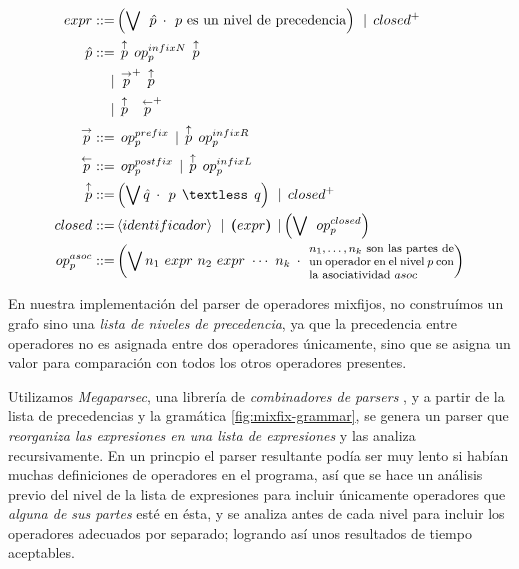 {\begin{investigationfr}
{   %
\newcommand{\overp}[1]{\overset{#1}{p}}
\renewcommand{\_}{\:\:}

\begin{equation*}
\begin{split}
expr ::=& \left( \bigvee \_ \hat{p} \_ \cdotp \_
                 \text{$p$ es un nivel de precedencia} \right) \_
        | \_ closed^{+}
\\
\hat{p} ::=& \_ \overp{\uparrow} \_ op_p^{infixN} \_ \overp{\uparrow} \\
          |& \_ \overp{\rightarrow}^{+} \_ \overp{\uparrow} \\
          |& \_ \overp{\uparrow}\quad \overp{\leftarrow}^{+}
\\
\overp{\rightarrow} ::=& \_ op_p^{prefix} \_
                       | \_ \overp{\uparrow} \_ op_p^{infixR}
\\
\overp{\leftarrow} ::=& \_ op_p^{postfix} \_
                      | \_ \overp{\uparrow} \_ op_p^{infixL}
\\
\overp{\uparrow} ::=& \left( \bigvee \hat{q} \_ \cdotp \_
                             p \_ \textless \_ q \right) \_
                    | \_ closed^{+}
\\
closed ::=& \left<identificador\right> \_
          | \_ \boldsymbol{(} expr \boldsymbol{)} \_
          | \left( \bigvee \_ op_p^{closed} \right)
\\
op_p^{asoc} ::=& \left( \bigvee n_1\ expr\ n_2\ expr\ \cdots\ n_k \_ \cdotp \_
                        \parbox{0.3\textwidth}{\footnotesize$n_1,\ldots,n_k$ son las partes de un operador en el nivel $p$ con la asociatividad $asoc$} \right)
\end{split}
\end{equation*}
\label{fig:mixfix-grammar}
}
\end{investigationfr}

\begin{implementationfr}
En nuestra implementación del parser de operadores mixfijos, no construímos un grafo sino una \emph{lista de niveles de precedencia}, ya que la precedencia entre operadores no es asignada entre dos operadores únicamente, sino que se asigna un valor para comparación con todos los otros operadores presentes.

Utilizamos \emph{Megaparsec}, una librería de \emph{combinadores de parsers} \cite{megaparsec}, y a partir de la lista de precedencias y la gramática \ref{fig:mixfix-grammar}, se genera un parser que \emph{reorganiza las expresiones en una lista de expresiones} y las analiza recursivamente. En un princpio el parser resultante podía ser muy lento si habían muchas definiciones de operadores en el programa, así que se hace un análisis previo del nivel de la lista de expresiones para incluir únicamente operadores que \emph{alguna de sus partes} esté en ésta, y se analiza antes de cada nivel para incluir los operadores adecuados por separado; logrando así unos resultados de tiempo aceptables.
\end{implementationfr}

}
